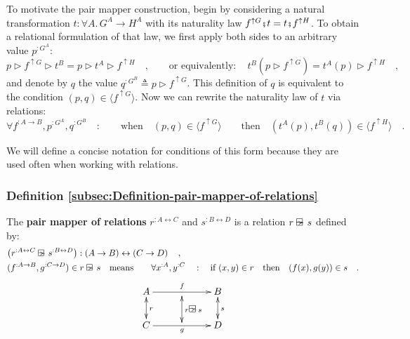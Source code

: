 To motivate the pair mapper construction, begin by considering a natural
transformation $t:\forall A.\,G^{A}\rightarrow H^{A}$ with its naturality
law $f^{\uparrow G}\bef t=t\bef f^{\uparrow H}$. To obtain a relational
formulation of that law, we first apply both sides to an arbitrary
value $p^{:G^{A}}$:
\[
p\triangleright f^{\uparrow G}\triangleright t^{B}=p\triangleright t^{A}\triangleright f^{\uparrow H}\quad,\quad\quad\text{or equivalently}:\quad t^{B}(p\triangleright f^{\uparrow G})=t^{A}(p)\triangleright f^{\uparrow H}\quad,
\]
and denote by $q$ the value $q^{:G^{B}}\triangleq p\triangleright f^{\uparrow G}$.
This definition of $q$ is equivalent to the condition $(p,q)\in\langle f^{\uparrow G}\rangle$.
Now we can rewrite the naturality law of $t$ via relations: 
\begin{equation}
\forall f^{:A\rightarrow B},p^{:G^{A}},q^{:G^{B}}\quad:\quad\quad\text{when}\quad(p,q)\in\langle f^{\uparrow G}\rangle\quad\quad\text{then}\quad(t^{A}(p),t^{B}(q))\in\langle f^{\uparrow H}\rangle\quad.\label{eq:naturality-law-of-t-derivation1}
\end{equation}

We will define a concise notation for conditions of this form because
they are used often when working with relations.

\subsubsection{Definition \label{subsec:Definition-pair-mapper-of-relations}\ref{subsec:Definition-pair-mapper-of-relations}}

The \textbf{pair mapper of relations}
$r^{:A\leftrightarrow C}$ and $s^{:B\leftrightarrow D}$ is a relation
$r\varogreaterthan s$ defined by:
\begin{align*}
 & \big(r^{:A\leftrightarrow C}\varogreaterthan s^{:B\leftrightarrow D}\big):\left(A\rightarrow B\right)\leftrightarrow\left(C\rightarrow D\right)\quad,\\
 & (f^{:A\rightarrow B},g^{:C\rightarrow D})\in r\varogreaterthan s\quad\text{means}\quad\quad\forall x^{:A},y^{:C}\quad:\quad\text{if }(x,y)\in r\quad\text{then}\quad(f(x),g(y))\in s\quad.
\end{align*}
\[
\xymatrix{\xyScaleY{1.8pc}\xyScaleX{2.2pc}A\ar@{<->}[d]\sp(0.5){r}\ar[rr]\sp(0.5){f} & \ar@{<->}[d(0.9)]\sp(0.55){r\varogreaterthan s} & B\ar@{<->}[d]\sp(0.5){s}\\
C\ar[rr]\sb(0.5){g} &  & D
}
\]

